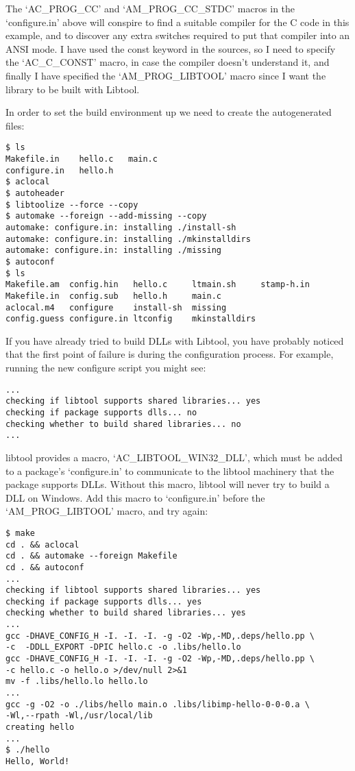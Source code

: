 The `AC\_{}PROG\_{}CC' and `AM\_{}PROG\_{}CC\_{}STDC' macros in 
the `configure.in' above will conspire to find a suitable compiler 
for the C code in this example, and to discover any extra switches 
required to put that compiler into an ANSI mode. I have used 
the const keyword in the sources, so I need to specify 
the `AC\_{}C\_{}CONST' macro, in case the compiler doesn't 
understand it, and finally I have specified the `AM\_{}PROG\_{}LIBTOOL' macro 
since I want the library to be built with Libtool.

In order to set the build environment up we need to create the autogenerated files: 

\begin{verbatim}
$ ls
Makefile.in    hello.c   main.c
configure.in   hello.h
$ aclocal
$ autoheader
$ libtoolize --force --copy
$ automake --foreign --add-missing --copy
automake: configure.in: installing ./install-sh
automake: configure.in: installing ./mkinstalldirs
automake: configure.in: installing ./missing
$ autoconf
$ ls
Makefile.am  config.hin   hello.c     ltmain.sh     stamp-h.in
Makefile.in  config.sub   hello.h     main.c
aclocal.m4   configure    install-sh  missing
config.guess configure.in ltconfig    mkinstalldirs
\end{verbatim}

If you have already tried to build DLLs with Libtool, you have probably noticed that the first point of failure is during the configuration process. For example, running the new configure script you might see:

\begin{verbatim}
...
checking if libtool supports shared libraries... yes
checking if package supports dlls... no
checking whether to build shared libraries... no
...
\end{verbatim}

libtool provides a macro, `AC\_{}LIBTOOL\_{}WIN32\_{}DLL', which must be added to a package's `configure.in' to communicate to the libtool machinery that the package supports DLLs. Without this macro, libtool will never try to build a DLL on Windows. Add this macro to `configure.in' before the `AM\_{}PROG\_{}LIBTOOL' macro, and try again:

\begin{verbatim}
$ make
cd . && aclocal
cd . && automake --foreign Makefile
cd . && autoconf
...
checking if libtool supports shared libraries... yes
checking if package supports dlls... yes
checking whether to build shared libraries... yes
...
gcc -DHAVE_CONFIG_H -I. -I. -I. -g -O2 -Wp,-MD,.deps/hello.pp \
-c  -DDLL_EXPORT -DPIC hello.c -o .libs/hello.lo
gcc -DHAVE_CONFIG_H -I. -I. -I. -g -O2 -Wp,-MD,.deps/hello.pp \
-c hello.c -o hello.o >/dev/null 2>&1
mv -f .libs/hello.lo hello.lo
...
gcc -g -O2 -o ./libs/hello main.o .libs/libimp-hello-0-0-0.a \
-Wl,--rpath -Wl,/usr/local/lib
creating hello
...
$ ./hello
Hello, World!
\end{verbatim}

